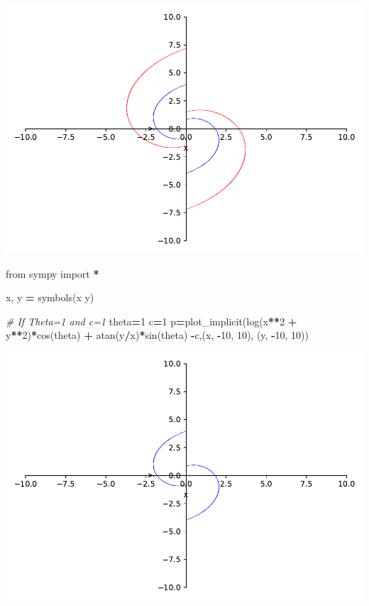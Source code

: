 \documentclass[
]{book}
\newenvironment{Shaded}{\begin{snugshade}}{\end{snugshade}}
\newcommand{\CommentTok}[1]{\textcolor[rgb]{0.56,0.35,0.01}{\textit{#1}}}
\newcommand{\DecValTok}[1]{\textcolor[rgb]{0.00,0.00,0.81}{#1}}
\newcommand{\ImportTok}[1]{#1}
\newcommand{\NormalTok}[1]{#1}
\newcommand{\OperatorTok}[1]{\textcolor[rgb]{0.81,0.36,0.00}{\textbf{#1}}}
\newcommand{\StringTok}[1]{\textcolor[rgb]{0.31,0.60,0.02}{#1}}
\theoremstyle{definition}
\theoremstyle{definition}
\theoremstyle{definition}
\theoremstyle{definition}
\theoremstyle{remark}
\begin{document}
\includegraphics{ConformalMapping_files/figure-latex/unnamed-chunk-60-5.pdf}

\begin{Shaded}
\begin{Highlighting}[]
\ImportTok{from}\NormalTok{ sympy }\ImportTok{import} \OperatorTok{*}

\NormalTok{x, y }\OperatorTok{=}\NormalTok{ symbols(}\StringTok{\textquotesingle{}x y\textquotesingle{}}\NormalTok{)}

\CommentTok{\# If Theta=1 and c=1}
\NormalTok{theta}\OperatorTok{=}\DecValTok{1}
\NormalTok{c}\OperatorTok{=}\DecValTok{1}
\NormalTok{p}\OperatorTok{=}\NormalTok{plot\_implicit(log(x}\OperatorTok{**}\DecValTok{2} \OperatorTok{+}\NormalTok{ y}\OperatorTok{**}\DecValTok{2}\NormalTok{)}\OperatorTok{*}\NormalTok{cos(theta) }\OperatorTok{+}\NormalTok{ atan(y}\OperatorTok{/}\NormalTok{x)}\OperatorTok{*}\NormalTok{sin(theta) }\OperatorTok{{-}}\NormalTok{c,(x, }\OperatorTok{{-}}\DecValTok{10}\NormalTok{, }\DecValTok{10}\NormalTok{), (y, }\OperatorTok{{-}}\DecValTok{10}\NormalTok{, }\DecValTok{10}\NormalTok{))}
\end{Highlighting}
\end{Shaded}

\includegraphics{ConformalMapping_files/figure-latex/unnamed-chunk-61-7.pdf}
\end{document}
